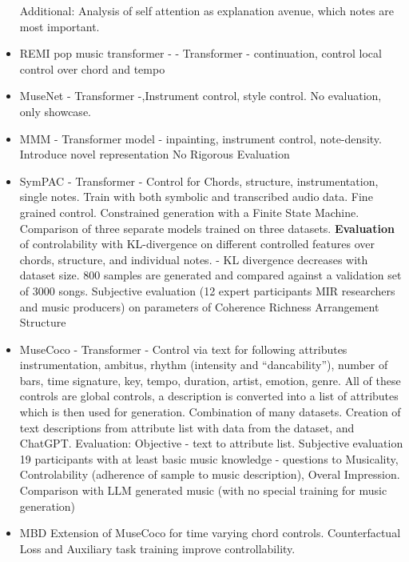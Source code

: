 \begin{itemize}
Additional: Analysis of self attention as explanation avenue, which notes are most important. 

\item REMI pop music transformer - \cite{Huang_Yang_remi_pop_transformer_2020} - Transformer - continuation, control local control over chord and tempo

\item MuseNet \cite{Christine_2019} - Transformer -,Instrument control, style control. No evaluation, only showcase.

\item MMM \cite{Ens_Pasquier_2020_MMM} - Transformer model - inpainting, instrument control, note-density.
Introduce novel representation
No Rigorous Evaluation 

\item SymPAC \cite{Chen_Smith_Spijkervet_Wang_Zou_Li_Kong_Du_2024}  - Transformer - Control for Chords, structure, instrumentation, single notes.
Train with both symbolic and transcribed audio data.
Fine grained control. Constrained generation with a Finite State Machine. 
Comparison of three separate models trained on three datasets.
\textbf{Evaluation} of controlability with KL-divergence on different controlled features over chords, structure, and individual notes. - KL divergence decreases with dataset size. 800 samples are generated and compared against a validation set of 3000 songs. 
Subjective evaluation (12 expert participants MIR researchers and music producers) on parameters of Coherence Richness Arrangement Structure 

\item MuseCoco \cite{Lu_Xu_Kang_Yu_Xing_Tan_Bian_MuseCoco_2023} - Transformer - Control via text for following attributes instrumentation, ambitus, rhythm (intensity and “dancability”), number of bars, time signature, key, tempo, duration, artist, emotion, genre. All of these controls are global controls, a description is converted into a list of  attributes which is then used for generation. 
Combination of many datasets. Creation of text descriptions from attribute list with data from the dataset, and ChatGPT. 
Evaluation: Objective - text to attribute list. 
Subjective evaluation 19 participants with at least basic music knowledge - questions to Musicality, Controlability (adherence of sample to music description), Overal Impression. Comparison with LLM generated music (with no special training for music generation)

\item MBD \cite{Shu_Xu_Musebarcontrol_2024} Extension of MuseCoco for time varying chord controls. Counterfactual Loss and Auxiliary task training improve controllability. 


\end{itemize}
